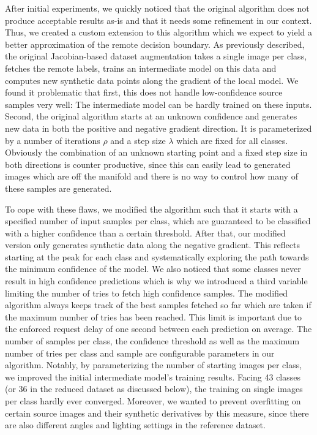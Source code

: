After initial experiments, we quickly noticed that the original algorithm does not produce acceptable results as-is and that it needs some refinement in our context.
Thus, we created a custom extension to this algorithm which we expect to yield a better approximation of the remote decision boundary.
As previously described, the original Jacobian-based dataset augmentation takes a single image per class, fetches the remote labels, trains an intermediate model on this data and computes new synthetic data points along the gradient of the local model.
We found it problematic that first, this does not handle low-confidence source samples very well: The intermediate model can be hardly trained on these inputs.
Second, the original algorithm starts at an unknown confidence and generates new data in both the positive and negative gradient direction.
It is parameterized by a number of iterations $\rho$ and a step size $\lambda$ which are fixed for all classes.
Obviously the combination of an unknown starting point and a fixed step size in both directions is counter productive, since this can easily lead to generated images which are off the manifold and there is no way to control how many of these samples are generated.

To cope with these flaws, we modified the algorithm such that it starts with a specified number of input samples per class, which are guaranteed to be classified with a higher confidence than a certain threshold.
After that, our modified version only generates synthetic data along the negative gradient.
This reflects starting at the peak for each class and systematically exploring the path towards the minimum confidence of the model.
We also noticed that some classes never result in high confidence predictions which is why we introduced a third variable limiting the number of tries to fetch high confidence samples.
The modified algorithm always keeps track of the best samples fetched so far which are taken if the maximum number of tries has been reached.
This limit is important due to the enforced request delay of one second between each prediction on average.
The number of samples per class, the confidence threshold as well as the maximum number of tries per class and sample are configurable parameters in our algorithm.
Notably, by parameterizing the number of starting images per class, we improved the initial intermediate model's training results. 
Facing 43 classes (or 36 in the reduced dataset as discussed below), the training on single images per class hardly ever converged.
Moreover, we wanted to prevent overfitting on certain source images and their synthetic derivatives by this measure, since there are also different angles and lighting settings in the reference dataset.

